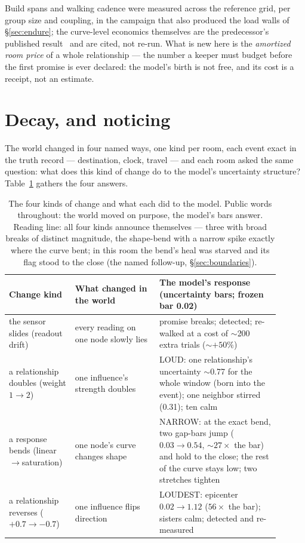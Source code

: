 \documentclass[11pt,a4paper]{article}
\begin{document}
Build spans and walking cadence were measured across the reference
grid, per group size and coupling, in the campaign that also produced
the load walls of \S\ref{sec:endure}; the curve-level economics
themselves are the predecessor's published result~\cite{p2} and are
cited, not re-run. What is new here is the \emph{amortized room
price} of a whole relationship --- the number a keeper must budget
before the first promise is ever declared: the model's birth is not
free, and its cost is a receipt, not an estimate.

\section{Decay, and noticing}
\label{sec:decay}

The world changed in four named ways, one kind per room, each event
exact in the truth record --- destination, clock, travel --- and each
room asked the same question: what does this kind of change do to the
model's uncertainty structure? Table~\ref{tab:kinds} gathers the
four answers.

\begin{table}[!ht]
\centering
\small
\begin{tabular}{@{}p{0.22\linewidth}p{0.28\linewidth}p{0.40\linewidth}@{}}
\toprule
\textbf{Change kind} & \textbf{What changed in the world} &
\textbf{The model's response (uncertainty bars; frozen bar 0.02)} \\
\midrule
the sensor slides (readout drift) & every reading on one node slowly
lies & promise breaks; detected; re-walked at a cost of $\sim$200
extra trials ($\sim$$+50\%$) \\
a relationship doubles (weight $1{\to}2$) & one influence's strength
doubles & LOUD: one relationship's uncertainty $\sim$0.77 for the
whole window (born into the event); one neighbor stirred (0.31); ten
calm \\
a response bends (linear$\to$saturation) & one node's curve changes
shape & NARROW: at the exact bend, two gap-bars jump ($0.03 \to 0.54$,
${\sim}27\times$ the bar) and hold to the close; the rest of the curve
stays low; two stretches tighten \\
a relationship reverses ($+0.7{\to}{-}0.7$) & one influence flips
direction & LOUDEST: epicenter $0.02 \to 1.12$ ($56\times$ the bar);
sisters calm; detected and re-measured \\
\bottomrule
\end{tabular}
\caption{The four kinds of change and what each did to the model.
Public words throughout: the world moved on purpose, the model's
bars answer. Reading line: all four kinds announce themselves ---
three with broad breaks of distinct magnitude, the shape-bend with a
narrow spike exactly where the curve bent; in this room the bend's
heal was starved and its flag stood to the close (the named
follow-up, \S\ref{sec:boundaries}).}
\label{tab:kinds}
\end{table}
\end{document}
